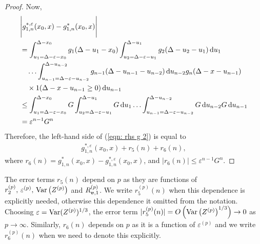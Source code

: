 \begin{proof}
	Now, 
	\begin{align*}
		&\Bigg|g_{1,n}^{*,\varepsilon}(x_0,x) - g_{1,n}^{*}(x_0,x)
		\Bigg|\nonumber
		\\&= \int_{u_1=\Delta-\varepsilon-x_0}^{\Delta-x_0}g_1(\Delta - u_1 - x_0)
		\int_{u_2=\Delta-\varepsilon-u_1}^{\Delta-u_1}g_2(\Delta - u_2 - u_1)\, \mathrm{d} u_1  \nonumber 
		\\&\quad\hdots 
            	\int_{u_{n-1}=\Delta-\varepsilon-u_{n-2}}^{\Delta-u_{n-2}} g_{n-1}(\Delta - u_{n-1} - u_{n-2}) \, \mathrm{d} u_{n-2}
            	g_{n}(\Delta - x-u_{n-1})\nonumber 
		\\&\quad\times 1(\Delta - x-u_{n-1}\geq 0)\, \mathrm{d} u_{n-1}\nonumber
		\\&\leq \int_{u_1=\Delta-\varepsilon-x_0}^{\Delta-x_0}G 
		\int_{u_2=\Delta-\varepsilon-u_1}^{\Delta-u_1}G \, \mathrm{d} u_1  \hdots 
            	\int_{u_{n-1}=\Delta-\varepsilon-u_{n-2}}^{\Delta-u_{n-2}} G \, \mathrm{d} u_{n-2}\nonumber
            	G\, \mathrm{d} u_{n-1} 
		\\& = \varepsilon^{n-1}G ^n 
	\end{align*}
	Therefore, the left-hand side of (\ref{eqn: rhs g 2}) is equal to 
	\begin{align*}
		g^{*,\varepsilon}_{1,n}(x_0,x) + r_5(n) + r_6(n),
	\end{align*}
	where \(r_6(n) = g_{1,n}^{*}(x_0,x) - g_{1,n}^{*,\varepsilon}(x_0,x) \), and \(|r_6(n)|\leq \varepsilon^{n-1}G ^n\).
\end{proof}

The error terms \(r_5(n)\) depend on \(p\) as they are functions of \(r_2^{(p)},\, \varepsilon^{(p)},\, \mathrm{Var}\left(Z^{(p)}\right)\) and \(R_{{\boldsymbol v},1}^{(p)}\). We write \(r_5^{(p)}(n)\) when this dependence is explicitly needed, otherwise this dependence it omitted from the notation. Choosing \(\varepsilon = \mathrm{Var}(Z^{(p)})^{1/3}\), the error term \(|r_5^{(p)}(n)|= O\left(\mathrm{Var}\left(Z^{(p)}\right)^{1/3}\right)\to 0\) as \(p\to\infty\). Similarly, \(r_6(n)\) depends on \(p\) as it is a function of \(\varepsilon^{(p)}\) and we write \(r_6^{(p)}(n)\) when we need to denote this explicitly. 

